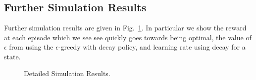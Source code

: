 \documentclass{article}
\begin{document}
\subsection{Further Simulation Results}\label{sim}
Further simulation results are given in Fig.~\ref{fig:sim_more}. In particular we show the reward at each episode which we see see quickly goes towards being optimal, the value of $\epsilon$ from using the $\epsilon$-greedy with decay policy, and learning rate using decay for a state.
\begin{figure}[H]
    \centering
    \hfill
    \caption{Detailed Simulation Results.}
    \label{fig:sim_more}
\end{figure}
\end{document}
